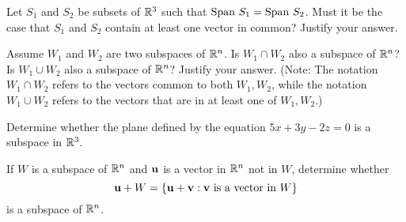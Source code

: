 \ea

\item Let $S_1$ and $S_2$ be subsets of $\mathbb{R}^3$ such that $\text{Span} \ S_1 = \text{Span} \ S_2$. Must it be the case that $S_1$ and $S_2$ contain at least one vector in common? Justify your answer. 

\item Assume $W_1$ and $W_2$ are two subspaces of $\mathbb{R}^n$. Is $W_1 \cap W_2$ also a subspace of $\mathbb{R}^n$? Is $W_1 \cup W_2$ also a subspace of $\mathbb{R}^n$? Justify your answer. (Note: The notation $W_1 \cap W_2$ refers to the vectors common to both $W_1, W_2$, while the notation $W_1 \cup W_2$ refers to the vectors that are in at least one of $W_1, W_2$.)

\item Determine whether the plane defined by the equation $5x+3y-2z=0$ is a subspace in $\mathbb{R}^3$. 

\item If $W$ is a subspace of $\mathbb{R}^n$ and $\mathbf{u}$ is a vector in $\mathbb{R}^n$ not in $W$, determine whether 
\[ \mathbf{u}+W = \{\mathbf{u}+\mathbf{v}: \mathbf{v} \text{ is a vector in }W\} \]
is a subspace of $\mathbb{R}^n$.

